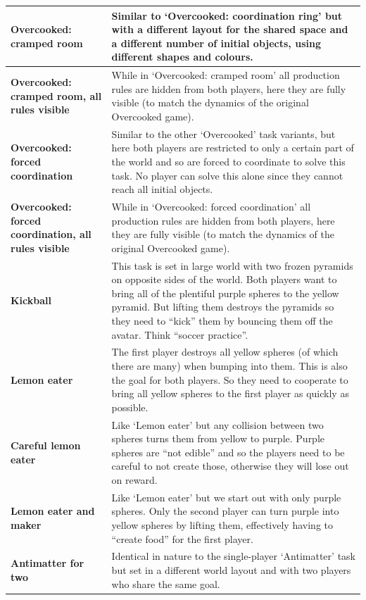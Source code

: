 \documentclass[11pt, a4paper, logo, copyright]{deepmind}
\begin{document}
\begin{appendix}
\begin{longtable}{|>{\raggedright}p{4cm}|p{12cm}|}
\textbf{Overcooked: cramped room} & Similar to `Overcooked: coordination ring' but with a different layout for the shared space and a different number of initial objects, using different shapes and colours. \\ \hline
\textbf{Overcooked: cramped room, all rules visible} & While in `Overcooked: cramped room' all production rules are hidden from both players, here they are fully visible (to match the dynamics of the original Overcooked game). \\ \hline
\textbf{Overcooked: forced coordination} & Similar to the other `Overcooked' task variants, but here both players are restricted to only a certain part of the world and so are forced to coordinate to solve this task. No player can solve this alone since they cannot reach all initial objects. \\ \hline
\textbf{Overcooked: forced coordination, all rules visible} & While in `Overcooked: forced coordination' all production rules are hidden from both players, here they are fully visible (to match the dynamics of the original Overcooked game). \\ \hline
\textbf{Kickball} & This task is set in large world with two frozen pyramids on opposite sides of the world. Both players want to bring all of the plentiful purple spheres to the yellow pyramid. But lifting them destroys the pyramids so they need to ``kick'' them by bouncing them off the avatar. Think ``soccer practice''. \\ \hline
\textbf{Lemon eater} & The first player destroys all yellow spheres (of which there are many) when bumping into them. This is also the goal for both players. So they need to cooperate to bring all yellow spheres to the first player as quickly as possible. \\ \hline
\textbf{Careful lemon eater} & Like `Lemon eater' but any collision between two spheres turns them from yellow to purple. Purple spheres are ``not edible'' and so the players need to be careful to not create those, otherwise they will lose out on reward. \\ \hline
\textbf{Lemon eater and maker} & Like `Lemon eater' but we start out with only purple spheres. Only the second player can turn purple into yellow spheres by lifting them, effectively having to ``create food'' for the first player. \\ \hline
\textbf{Antimatter for two} & Identical in nature to the single-player `Antimatter' task but set in a different world layout and with two players who share the same goal. \\ \hline

\end{longtable}
\end{appendix}
\end{document}
